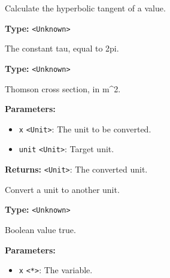 \documentclass[12pt,a4paper]{article}
\begin{document}
\noindent Calculate the hyperbolic tangent of a value.

\vspace{5mm}
\noindent {}\vspace{4mm}


\noindent \textbf{Type:} \texttt{<Unknown>}

\noindent The constant tau, equal to 2pi.

\vspace{5mm}
\noindent {}\vspace{4mm}


\noindent \textbf{Type:} \texttt{<Unknown>}

\noindent Thomson cross section, in m\textasciicircum{}2.

\vspace{5mm}
\noindent {}


\noindent \textbf{Parameters:}
\begin{itemize}
  \item \texttt{x} \texttt{<Unit>}: The unit to be converted.
  \item \texttt{unit} \texttt{<Unit>}: Target unit.
\end{itemize}

\noindent \textbf{Returns:} \texttt{<Unit>}: The converted unit.

\noindent Convert a unit to another unit.

\vspace{5mm}
\noindent {}\vspace{4mm}


\noindent \textbf{Type:} \texttt{<Unknown>}

\noindent Boolean value true.

\vspace{5mm}
\noindent {}


\noindent \textbf{Parameters:}
\begin{itemize}
  \item \texttt{x} \texttt{<*>}: The variable.
\end{itemize}
\end{document}
